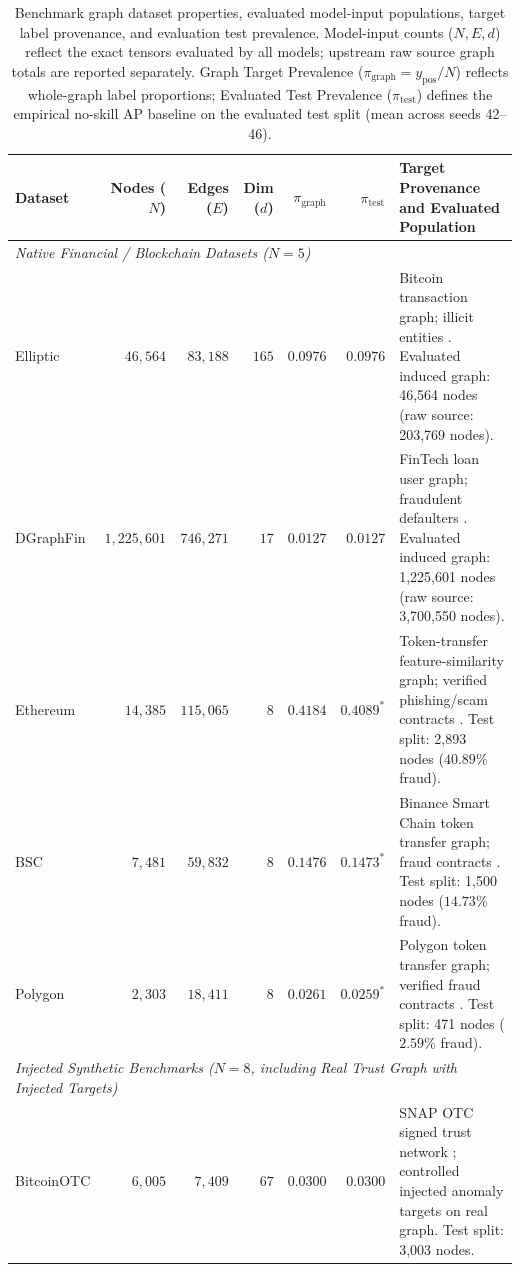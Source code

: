 \documentclass[11pt,a4paper]{article}
\begin{document}
\begin{table}[htbp]
\centering\fontsize{7.5pt}{8.8pt}\selectfont\setlength{\tabcolsep}{2.5pt}
\caption{Benchmark graph dataset properties, evaluated model-input populations, target label provenance, and evaluation test prevalence. Model-input counts ($N, E, d$) reflect the exact tensors evaluated by all models; upstream raw source graph totals are reported separately. Graph Target Prevalence ($\pi_{\mathrm{graph}} = y_{\mathrm{pos}} / N$) reflects whole-graph label proportions; Evaluated Test Prevalence ($\pi_{\mathrm{test}}$) defines the empirical no-skill AP baseline on the evaluated test split (mean across seeds 42--46).}
\label{tab:dataset_properties}
\begin{tabularx}{\textwidth}{lrrrrr>{\raggedright\arraybackslash}X}\toprule
\textbf{Dataset} & \textbf{Nodes ($N$)} & \textbf{Edges ($E$)} & \textbf{Dim ($d$)} & $\pi_{\mathrm{graph}}$ & $\pi_{\mathrm{test}}$ & \textbf{Target Provenance and Evaluated Population} \\\midrule
\multicolumn{7}{l}{\textit{Native Financial / Blockchain Datasets ($N=5$)}} \\
Elliptic & $46,564$ & $83,188$ & $165$ & $0.0976$ & $0.0976$ & Bitcoin transaction graph; illicit entities \cite{weber2019elliptic}. Evaluated induced graph: 46,564 nodes (raw source: 203,769 nodes). \\
DGraphFin & $1,225,601$ & $746,271$ & $17$ & $0.0127$ & $0.0127$ & FinTech loan user graph; fraudulent defaulters \cite{huang2022dgraph}. Evaluated induced graph: 1,225,601 nodes (raw source: 3,700,550 nodes). \\
Ethereum & $14,385$ & $115,065$ & $8$ & $0.4184$ & $0.4089^*$ & Token-transfer feature-similarity graph; verified phishing/scam contracts \cite{luo2024multichain}. Test split: 2,893 nodes ($40.89\%$ fraud). \\
BSC & $7,481$ & $59,832$ & $8$ & $0.1476$ & $0.1473^*$ & Binance Smart Chain token transfer graph; fraud contracts \cite{luo2024multichain}. Test split: 1,500 nodes ($14.73\%$ fraud). \\
Polygon & $2,303$ & $18,411$ & $8$ & $0.0261$ & $0.0259^*$ & Polygon token transfer graph; verified fraud contracts \cite{luo2024multichain}. Test split: 471 nodes ($2.59\%$ fraud). \\
\midrule
\multicolumn{7}{l}{\textit{Injected Synthetic Benchmarks ($N=8$, including Real Trust Graph with Injected Targets)}} \\
BitcoinOTC & $6,005$ & $7,409$ & $67$ & $0.0300$ & $0.0300$ & SNAP OTC signed trust network \cite{kumar2016edge,snapbitcoinotc}; controlled injected anomaly targets on real graph. Test split: 3,003 nodes. \\

\end{tabularx}
\end{table}
\end{document}
